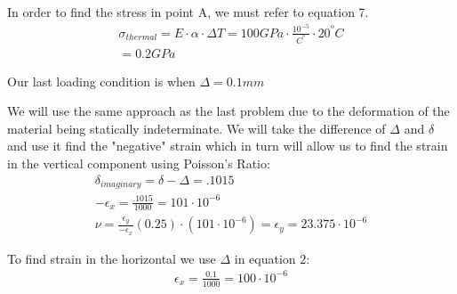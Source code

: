\documentclass[12pt]{article}
\begin{document}
In order to find the stress in point A, we must refer to equation 7.
\begin{gather*}
\sigma_{thermal} = E \cdot \alpha \cdot \Delta T 
= 100 GPa \cdot \frac{10^{-5}}{C^{º}} \cdot 20 ^{º}C\\
=0.2GPa
\end{gather*}
\pagebreak

Our last loading condition is when $\Delta = 0.1mm$
\newline

We will use the same approach as the last problem due to the deformation of the material being statically indeterminate. We will take the difference of $\Delta$ and $\delta$ and use it find the "negative" strain which in turn will allow us to find the strain in the vertical component using Poisson's Ratio:
\begin{gather} 
\delta_{imaginary} = \delta - \Delta = .1015\\
-\epsilon_{x} = \frac{.1015}{1000} = 101 \cdot 10^{-6}\\
\nu = \frac{\epsilon_{y}}{-\epsilon_{x}}
(0.25) \cdot (101 \cdot 10^{-6}) = \epsilon_{y} = 23.375 \cdot 10^{-6}
\end{gather}

To find strain in the horizontal we use $\Delta$ in equation 2:
\begin{gather*}
\epsilon_{x} = \frac{0.1}{1000} = 100 \cdot 10^{-6}
\end{gather*}
\end{document}
